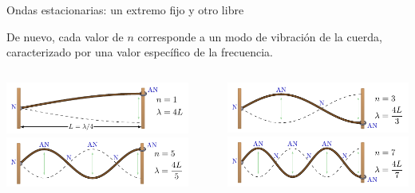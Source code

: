 \documentclass[11pt,handout,aspectratio=1610]{beamer}
\newcommand{\vs}{\vspace{11pt}}
\begin{document}
\begin{frame}{Ondas estacionarias: un extremo fijo y otro libre}

    De nuevo, cada valor de $n$ corresponde a un modo de vibración de la cuerda, caracterizado por una valor específico de la frecuencia.

    \vs 

    \begin{columns}
        \begin{column}{0.45\textwidth}
            \includegraphics[width=1.\textwidth]{../figs/waves_standing-7.pdf} \\
            \includegraphics[width=1.\textwidth]{../figs/waves_standing-9.pdf}
        \end{column}
        ~
        \begin{column}{0.45\textwidth}
            \includegraphics[width=1.\textwidth]{../figs/waves_standing-8.pdf} \\
            \includegraphics[width=1.\textwidth]{../figs/waves_standing-10.pdf}
        \end{column}
    \end{columns}

\end{frame}
\end{document}
